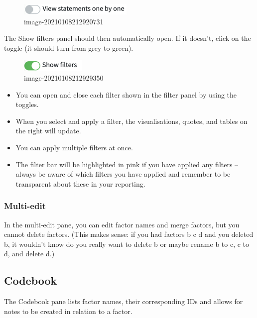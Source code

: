 \documentclass[
]{book}
\begin{document}
\begin{figure}
\centering
\includegraphics{_assets/image-20210108212920731.png}
\caption{image-20210108212920731}
\end{figure}

The Show filters panel should then automatically open. If it doesn't, click on the toggle (it should turn from grey to green).

\begin{figure}
\centering
\includegraphics{_assets/image-20210108212929350.png}
\caption{image-20210108212929350}
\end{figure}

\begin{itemize}
\item
  You can open and close each filter shown in the filter panel by using the toggles.
\item
  When you select and apply a filter, the visualisations, quotes, and tables on the right will update.
\item
  You can apply multiple filters at once.
\item
  The filter bar will be highlighted in pink if you have applied any filters -- always be aware of which filters you have applied and remember to be transparent about these in your reporting.
\end{itemize}

\hypertarget{multi-edit}{%
\subsubsection{Multi-edit}\label{multi-edit}}

In the multi-edit pane, you can edit factor names and merge factors, but you cannot delete factors. (This makes sense: if you had factors b c d and you deleted b, it wouldn't know do you really want to delete b or maybe rename b to c, c to d, and delete d.)

\hypertarget{codebook}{%
\subsection{Codebook}\label{codebook}}

The Codebook pane lists factor names, their corresponding IDs and allows for notes to be created in relation to a factor.
\end{document}
